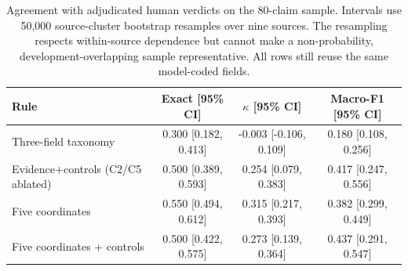 \begin{table}[t]
\centering
\small
\setlength{\tabcolsep}{5pt}
\begin{tabularx}{\linewidth}{Xccc}
\toprule
\textbf{Rule} & \textbf{Exact [95\% CI]} &
\textbf{$\kappa$ [95\% CI]} & \textbf{Macro-F1 [95\% CI]} \\
\midrule
Three-field taxonomy & 0.300 [0.182, 0.413] & -0.003 [-0.106, 0.109] & 0.180 [0.108, 0.256] \\
Evidence+controls (C2/C5 ablated) & 0.500 [0.389, 0.593] & 0.254 [0.079, 0.383] & 0.417 [0.247, 0.556] \\
Five coordinates & 0.550 [0.494, 0.612] & 0.315 [0.217, 0.393] & 0.382 [0.299, 0.449] \\
Five coordinates + controls & 0.500 [0.422, 0.575] & 0.273 [0.139, 0.364] & 0.437 [0.291, 0.547] \\
\bottomrule
\end{tabularx}
\caption{Agreement with adjudicated human verdicts on the 80-claim sample.
Intervals use 50,000 source-cluster bootstrap resamples
over nine sources. The resampling respects within-source dependence but cannot
make a non-probability, development-overlapping sample representative. All
rows still reuse the same model-coded fields.}
\label{tab:main-rule-reliability}
\end{table}
